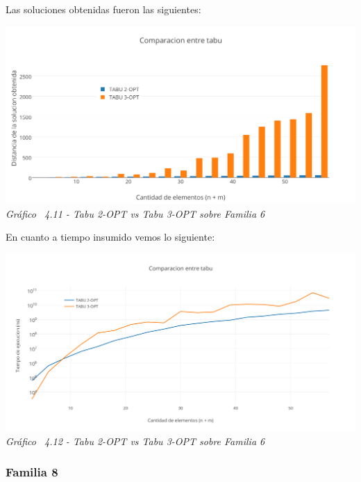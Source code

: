 Las soluciones obtenidas fueron las siguientes:

\vspace*{0.3cm} \vspace*{0.3cm}
  \begin{center}
 \includegraphics[scale=0.5]{./EJ4/comparativosinorden.png}\\
 {            \textit{Gráfico \ 4.11 - Tabu 2-OPT vs Tabu 3-OPT sobre Familia 6}}
  \end{center}
  \vspace*{0.3cm}

En cuanto a tiempo insumido vemos lo siguiente:

\vspace*{0.3cm} \vspace*{0.3cm}
  \begin{center}
 \includegraphics[scale=0.5]{./EJ4/comparacionsinorden1.png}\\
 {            \textit{Gráfico \ 4.12 - Tabu 2-OPT vs Tabu 3-OPT sobre Familia 6}}
  \end{center}
  \vspace*{0.3cm}

  
  
\subsubsection*{Familia 8}

